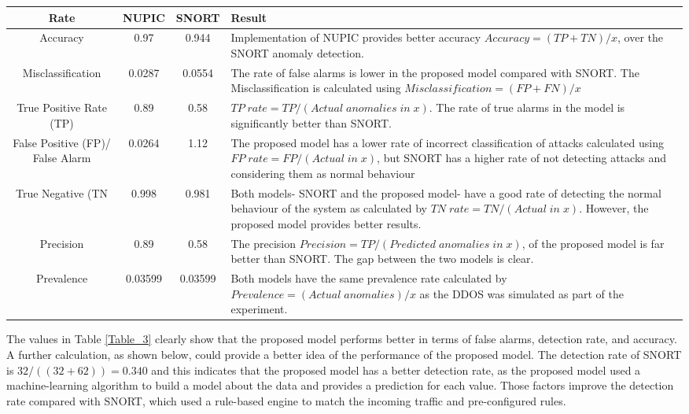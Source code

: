 \documentclass{ieeeaccess}
\begin{document}
\begin{table*}[h!]
\centering
\footnotesize
\caption{Comparison between SNORT Anomaly Detection and the Proposed Model}
\label{Table_3}
\begin{tabular}{|c|c|c|p{8cm}|}
 \hline 
 Rate & NUPIC & SNORT & Result \\ 
 \hline 
 Accuracy  & 0.97 & 0.944 &  Implementation of NUPIC provides better accuracy $Accuracy=(TP+TN)/x$, over the SNORT anomaly detection. \\ 
 \hline 
 Misclassification  & 0.0287 & 0.0554 & The rate of false alarms is lower in the proposed model compared with SNORT. The Misclassification is calculated using $Misclassification=(FP+FN )/x$ \\ 
 \hline 
 True Positive Rate (TP)  & 0.89 & 0.58 & $TP\;rate=TP/(Actual\;anomalies\;in\;x)$. The rate of true alarms in the model is significantly better than SNORT. \\ 
 \hline 
 False Positive (FP)/ False Alarm & 0.0264 & 1.12 & The proposed model has a lower rate of incorrect classification of attacks calculated using $FP \;rate =FP/(Actual\;in\;x)$, but SNORT has a higher rate of not detecting attacks and considering them as normal behaviour \\ 
 \hline 
 True Negative (TN & 0.998 & 0.981 & Both models- SNORT and the proposed model- have a good rate of detecting the normal behaviour of the system as calculated by $TN\;rate=TN/(Actual\;in\;x)$. However, the proposed model provides better results.  \\ 
 \hline 
 Precision  & 0.89 & 0.58 & The precision $Precision=TP/(Predicted\;anomalies\;in\;x)$, of the proposed model is far better than SNORT. The gap between the two models is clear. \\ 
 \hline 
 Prevalence  & 0.03599 & 0.03599 & Both models have the same prevalence rate calculated by $Prevalence=(Actual\;anomalies)/x$ as the DDOS was simulated as part of the experiment. \\ 
 \hline 
 \end{tabular} 
\end{table*}

The values in Table \ref{Table_3} clearly show that the proposed model performs better in terms of false alarms, detection rate, and accuracy. A further calculation, as shown below, could provide a better idea of the performance of the proposed model. The detection rate of SNORT is $32/((32+62) )=0.340$ and this indicates that the proposed model has a better detection rate, as the proposed model used a machine-learning algorithm to build a model about the data and provides a prediction for each value. Those factors improve the detection rate compared with SNORT, which used a rule-based engine to match the incoming traffic and pre-configured rules. 
\end{document}
